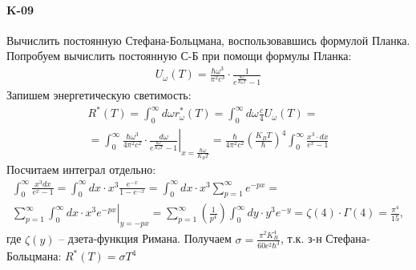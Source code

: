 \documentclass[__main__.tex]{subfiles}
\begin{document}
\paragraph{K-09}
	Вычислить постоянную Стефана-Больцмана, воспользовавшись формулой Планка.\\

Попробуем вычислить постоянную С-Б при помощи формулы Планка:
	\begin{gather*}
	U_\omega(T)=\frac{\hbar\omega^3}{\pi^2c^3}\cdot\frac{1}{e^{\frac{\hbar\omega}{K_BT}}-1}
	\end{gather*}
	Запишем энергетическую светимость:
	\begin{gather*}
	R^\ast(T)
	=
	\int_{0}^{\infty}d\omega r^\ast_\omega(T)
	=
	\int_{0}^{\infty}d\omega\frac{c}{4}U_\omega(T)
	=\\
	=
	\left.
	\int_{0}^{\infty}\frac{\hbar\omega^3}{4\pi^2c^2}\cdot\frac{d\omega}{e^{\frac{\hbar\omega}{K_BT}}-1}
	\right|_{x=\frac{\hbar\omega}{K_BT}}
	=
	\frac{\hbar}{4\pi^2c^2}\left(\frac{K_BT}{\hbar}\right)^4\int_{0}^{\infty}\frac{x^3\cdot dx}{e^x-1}
	\end{gather*}
	Посчитаем интеграл отдельно:
	\begin{gather*}
	\int_{0}^{\infty}\frac{x^3dx}{e^x-1}
	=
	\int_{0}^{\infty}dx\cdot x^3\frac{e^{-x}}{1-e^{-x}}
	=
	\int_{0}^{\infty}dx\cdot x^3\sum_{p=1}^{\infty}e^{-px}
	=\\
	\left.
	\sum_{p=1}^{\infty}\int_{0}^{\infty}dx\cdot x^3e^{-px}
	\right|_{y=-px}
	=
	\sum_{p=1}^{\infty}\left(\frac{1}{p^4}\right)\int_{0}^{\infty}dy\cdot y^3e^{-y}
	=
	\zeta(4)\cdot\Gamma(4)
	=
	\frac{\pi^4}{15},
	\end{gather*}
	где $\zeta(y)$ -- дзета-функция Римана.
	Получаем $\sigma=\frac{\pi^2K_B^4}{60c^2\hbar^3}$, т.к. з-н Стефана-Больцмана: $R^\ast(T)=\sigma T^4$
\end{document}
